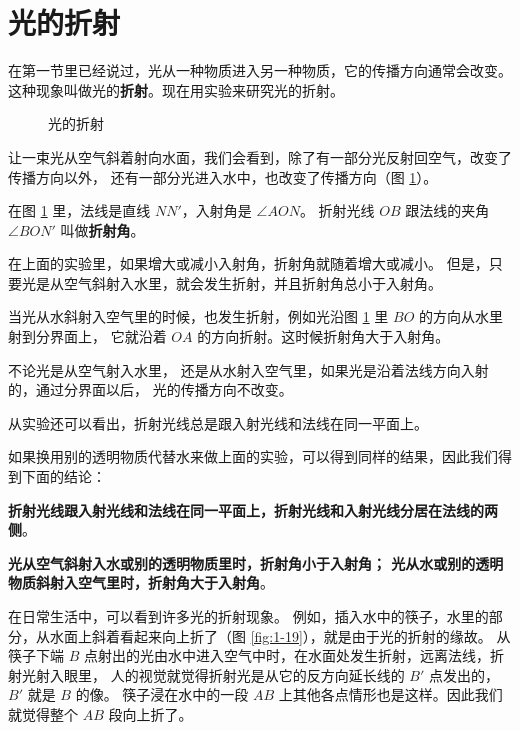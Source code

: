 \section{光的折射}\label{sec:1-5}

在第一节里已经说过，光从一种物质进入另一种物质，它的传播方向通常会改变。
这种现象叫做光的\textbf{折射}。现在用实验来研究光的折射。

\begin{figure}
    \centering
    
    \caption{光的折射}\label{fig:1-18}
\end{figure}

让一束光从空气斜着射向水面，我们会看到，除了有一部分光反射回空气，改变了传播方向以外，
还有一部分光进入水中，也改变了传播方向（图 \ref{fig:1-18}）\footnotemark。

在图 \ref{fig:1-18} 里，法线是直线 $NN'$，入射角是 $\angle AON$。
折射光线 $OB$ 跟法线的夹角 $\angle BON'$ 叫做\textbf{折射角}。

在上面的实验里，如果增大或减小入射角，折射角就随着增大或减小。
但是，只要光是从空气斜射入水里，就会发生折射，并且折射角总小于入射角。

当光从水斜射入空气里的时候，也发生折射，例如光沿图 \ref{fig:1-18} 里 $BO$ 的方向从水里射到分界面上，
它就沿着 $OA$ 的方向折射。这时候折射角大于入射角。

不论光是从空气射入水里， 还是从水射入空气里，如果光是沿着法线方向入射的，通过分界面以后，
光的传播方向不改变。

从实验还可以看出，折射光线总是跟入射光线和法线在同一平面上。

如果换用别的透明物质代替水来做上面的实验，可以得到同样的结果，因此我们得到下面的结论：

\textbf{折射光线跟入射光线和法线在同一平面上，折射光线和入射光线分居在法线的两侧}。

\textbf{%
光从空气斜射入水或别的透明物质里时，折射角小于入射角；
光从水或别的透明物质斜射入空气里时，折射角大于入射角}。

在日常生活中，可以看到许多光的折射现象。
例如，插入水中的筷子，水里的部分，从水面上斜着看起来向上折了（图 \ref{fig:1-19}），就是由于光的折射的缘故。
从筷子下端 $B$ 点射出的光由水中进入空气中时，在水面处发生折射，远离法线，折射光射入眼里，
人的视觉就觉得折射光是从它的反方向延长线的 $B'$ 点发出的，$B'$ 就是 $B$ 的像。
筷子浸在水中的一段 $AB$ 上其他各点情形也是这样。因此我们就觉得整个 $AB$ 段向上折了。


